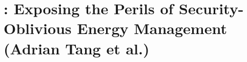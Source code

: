 \section{\clkscrew: Exposing the Perils of Security-Oblivious Energy Management (Adrian Tang et al.)}
